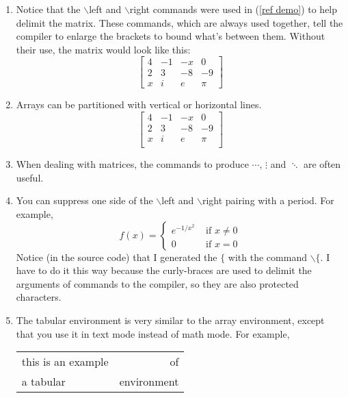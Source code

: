\documentclass[12pt]{report} %
\begin{document}
\begin{enumerate}
\item Notice that the $\backslash$left and $\backslash$right commands were 
used in (\ref{ref demo}) to help delimit the matrix.  These commands, which are 
always used together, tell the compiler to enlarge the brackets to bound what's 
between them.  Without their use, the matrix would look like this:
$$
 [ 
\begin{array}{cclr}
4 & -1 & -x & 0 \\
2 & 3 & -8 & -9 \\
x & i & e & \pi
\end{array}
 ]
$$
\item Arrays can be partitioned with vertical or horizontal lines.
$$
\left [ 
\begin{array}{ccl|r}
4 & -1 & -x & 0 \\
\hline
2 & 3 & -8 & -9 \\
x & i & e & \pi \\
\end{array}
\right ]
$$

\item When dealing with matrices, the commands to produce $\cdots$, $\vdots$ 
and $\ddots$ are often useful.

\item You can suppress one side of the $\backslash$left and $\backslash$right 
pairing with a period.  For example,
$$
f(x) = \left \{ 
\begin{array}{ll}
e^{-1/x^2} & \mbox{ if } x \not = 0 \\
0 & \mbox{ if } x =0
\end{array} 
\right .
$$
Notice (in the source code) that I generated the $\{$ with the command 
$\backslash \{$.  I have to do it this way because the curly-braces are used 
to delimit the arguments of commands to the compiler, so they are also protected 
characters.

\item The tabular environment is very similar to the array environment, except 
that you use it in text mode instead of math mode.  For example,
\begin{center} %
\begin{tabular}{lr} %
this is an example & of \\
a tabular & environment
\end{tabular} %
\end{center} %


\end{enumerate}
\end{document}
